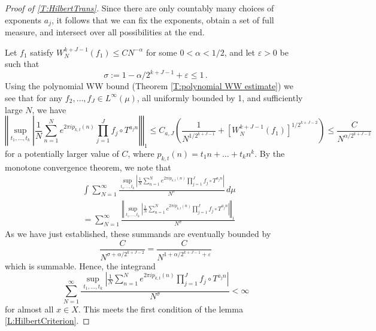 \documentclass[11pt, oneside]{amsart}   	%
\newcommand{\ep}{\varepsilon}
\newcommand{\1}{\mathbbm{1}}
\theoremstyle{definition}
\begin{document}
\begin{proof}[Proof of \ref{T:HilbertTrans}]
Since there are only countably many choices of exponents $a_j$, it follows that we can fix the exponents, obtain a set of full measure, and intersect over all possibilities at the end.

Let $f_1$ satisfy $W^{k+J-1}_N(f_1) \leq CN^{-\alpha}$ for some $0<\alpha<1/2$, and let $\ep > 0$ be such that 
$$\sigma := 1- \alpha/2^{k+J-1} + \ep \leq 1 \, .$$ 
Using the polynomial WW bound (Theorem \ref{T:polynomial WW estimate}) we see that for any $f_2, \dots, f_{J}\in L^\infty(\mu)$, all uniformly bounded by 1, and sufficiently large $N$, we have
$$\left\Vert \sup_{t_1, \dots, t_k}\left|\frac{1}{N}\sum_{n=1}^N e^{2\pi i p_{k, t}(n)} \prod_{j=1}^{J} f_j \circ T^{a_j n}\right| \right \Vert_1 \leq C_{a, J} \left( \frac{1}{N^{1/2^{k+J-1}}} + \left[W_N^{k+J-1} (f_1)\right]^{1/2^{k+J-2}} \right) \leq \frac{C}{N^{\alpha/2^{k+J-2}}}$$
for a potentially larger value of $C$, where $p_{k, t}(n) = t_1n + \dots + t_kn^k$. By the monotone convergence theorem, we note that
\begin{align*}
&\int \sum_{N=1}^\infty \frac{\sup_{t_1, \dots, t_k}\left|\frac{1}{N}\sum_{n=1}^N e^{2\pi i p_{k, t}(n)} \prod_{j=1}^{J} f_j \circ T^{a_j n}\right|}{N^\sigma} \, d\mu \\&=  \sum_{N=1}^\infty \frac{\left\Vert\sup_{t_1, \dots, t_k}\left|\frac{1}{N}\sum_{n=1}^N e^{2\pi i p_{k, t}(n)} \prod_{j=1}^{J} f_j \circ T^{a_j n}\right| \right\Vert_1}{N^\sigma} %
\end{align*}
As we have just established, these summands are eventually bounded by 
$$\frac{C}{N^{\sigma + \alpha/2^{k+J - 2}}} = \frac{C}{N^{1 + \alpha/2^{k+J-1} + \ep}}$$
which is summable. Hence, the integrand  
$$\sum_{N=1}^\infty \frac{\sup_{t_1, \dots, t_k}\left|\frac{1}{N}\sum_{n=1}^N e^{2\pi i p_{k, t}(n)} \prod_{j=1}^{J} f_j \circ T^{a_j n}\right|}{N^\sigma} < \infty$$ for almost all $x\in X$. This meets the first condition of the lemma \ref{L:HilbertCriterion}.


\end{proof}
\end{document}
